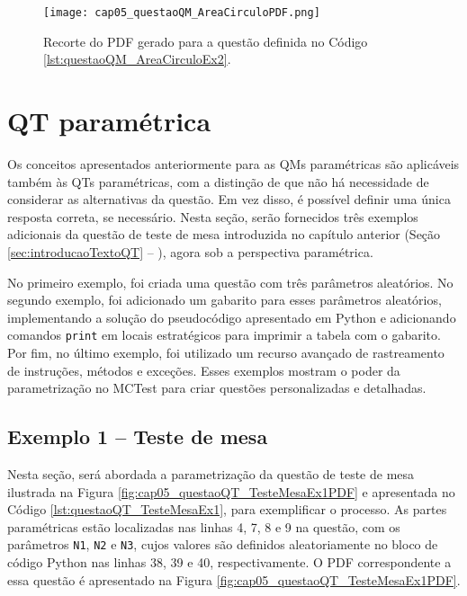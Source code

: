 \begin{figure}[!ht]
  \texttt{[image: cap05\_questaoQM\_AreaCirculoPDF.png]}
  \caption{Recorte do PDF gerado para a questão definida no Código \ref{lst:questaoQM_AreaCirculoEx2}.}
  \label{fig:cap05_questaoQM_AreaCirculoPDF}
\end{figure}


\section{QT paramétrica}

Os conceitos apresentados anteriormente para as QMs paramétricas são aplicáveis também às QTs paramétricas, com a distinção de que não há necessidade de considerar as alternativas da questão. Em vez disso, é possível definir uma única resposta correta, se necessário. Nesta seção, serão fornecidos três exemplos adicionais da questão de teste de mesa introduzida no capítulo anterior (Seção \ref{sec:introducaoTextoQT} -- ), agora sob a perspectiva paramétrica.

No primeiro exemplo, foi criada uma questão com três parâmetros aleatórios. No segundo exemplo, foi adicionado um gabarito para esses parâmetros aleatórios, implementando a solução do pseudocódigo apresentado em Python e adicionando comandos \verb|print| em locais estratégicos para imprimir a tabela com o gabarito. Por fim, no último exemplo, foi utilizado um recurso avançado de rastreamento de instruções, métodos e exceções.
%
Esses exemplos mostram o poder da parametrização no MCTest para criar questões personalizadas e detalhadas.

\subsection{Exemplo 1 -- Teste de mesa}

Nesta seção, será abordada a parametrização da questão de teste de mesa ilustrada na Figura \ref{fig:cap05_questaoQT_TesteMesaEx1PDF} e apresentada no Código \ref{lst:questaoQT_TesteMesaEx1}, para exemplificar o processo. As partes paramétricas estão localizadas nas linhas 4, 7, 8 e 9 na questão, com os parâmetros \verb|N1|, \verb|N2| e \verb|N3|, cujos valores são definidos aleatoriamente no bloco de código Python nas linhas 38, 39 e 40, respectivamente. O PDF correspondente a essa questão é apresentado na Figura \ref{fig:cap05_questaoQT_TesteMesaEx1PDF}.



